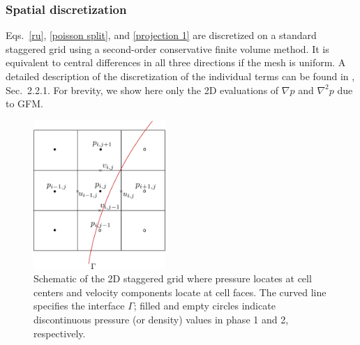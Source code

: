 
\subsubsection{Spatial discretization}
\label{sec: spatial}

Eqs.\ \eqref{ru}, \eqref{poisson split}, and \eqref{projection 1} are discretized on a standard staggered grid using a second-order conservative finite volume method. It is equivalent to central differences in all three directions if the mesh is uniform. A detailed description of the discretization of the individual terms can be found in \cite{Dodd_JCP_2014}, Sec.\ 2.2.1. For brevity, we show here only the 2D evaluations of $\nabla p$ and $\nabla^2 p$ due to GFM.
\begin{figure}[t]
 \begin{center}
 \includegraphics[width=5cm]{Figures/grid.pdf}
 \end{center}
 \caption{Schematic of the 2D staggered grid where pressure locates at cell centers and velocity components locate at cell faces. The curved line specifies the interface $\Gamma$; filled and empty circles indicate discontinuous pressure (or density) values in phase 1 and 2, respectively.}
 \label{fig: GFM}
\end{figure}

